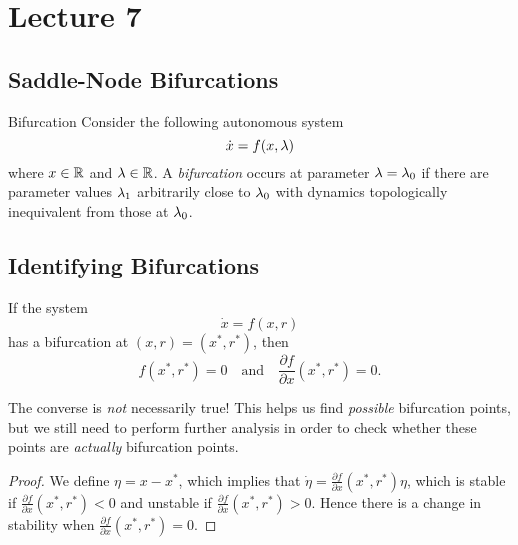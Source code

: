\documentclass[class=article, crop=false]{standalone}
\begin{document}
  \section{Lecture 7}
  \subsection{Saddle-Node Bifurcations}
  \begin{definition}{Bifurcation}
    Consider the following autonomous system
    \[
      \dot{x} = f(x, \lambda)
    \]
    where $x\in\mathbb{R}$ and $\lambda\in\mathbb{R}$. A \emph{bifurcation} occurs at parameter $\lambda = \lambda_0$ if there are parameter values $\lambda_1$ arbitrarily close to $\lambda_0$ with dynamics topologically inequivalent from those at $\lambda_0$.
  \end{definition}
  \subsection{Identifying Bifurcations}
  If the system
  \[
    \dot{x} = f(x, r)
  \]
  has a bifurcation at $(x, r) = (x^*, r^*)$, then
  \[
    f(x^*, r^*) = 0\quad\text{and}\quad \frac{\partial f}{\partial x}(x^*, r^*) = 0.
  \]
  \begin{note}{}
    The converse is \emph{not} necessarily true! This helps us find \emph{possible} bifurcation points, but we still need to perform further analysis in order to check whether these points are \emph{actually} bifurcation points.
  \end{note}
  \begin{proof}
    We define $\eta = x - x^*$, which implies that $\dot{\eta} = \frac{\partial f}{\partial x}(x^*, r^*)\eta$, which is stable if $\frac{\partial f}{\partial x}(x^*, r^*) < 0$ and unstable if $\frac{\partial f}{\partial x}(x^*, r^*) > 0$. Hence there is a change in stability when $\frac{\partial f}{\partial x}(x^*, r^*) = 0$.
  \end{proof}
\end{document}
